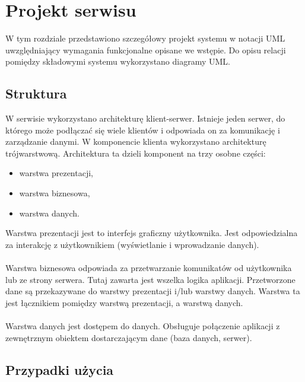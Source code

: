\chapter{Projekt serwisu}
\thispagestyle{chapterBeginStyle}

W tym rozdziale przedstawiono szczegółowy projekt systemu w notacji UML uwzględniający wymagania funkcjonalne opisane we wstępie. Do opisu relacji pomiędzy składowymi systemu wykorzystano diagramy UML.

\section{Struktura}

W serwisie wykorzystano architekturę klient-serwer. Istnieje jeden serwer, do którego może podłączać się wiele klientów i odpowiada on za komunikację i zarządzanie danymi.
W komponencie klienta wykorzystano architekturę trójwarstwową. Architektura ta dzieli komponent na trzy osobne części:
\begin{itemize}
	\item warstwa prezentacji,
	\item warstwa biznesowa,
	\item warstwa danych.
\end{itemize}
Warstwa prezentacji jest to interfejs graficzny użytkownika. Jest odpowiedzialna za interakcję z użytkownikiem (wyświetlanie i wprowadzanie danych). \\ \\
Warstwa biznesowa odpowiada za przetwarzanie komunikatów od użytkownika lub ze strony serwera. Tutaj zawarta jest wszelka logika aplikacji. Przetworzone dane są przekazywane do warstwy prezentacji i/lub warstwy danych. Warstwa ta jest łącznikiem pomiędzy warstwą prezentacji, a warstwą danych. \\ \\
Warstwa danych jest dostępem do danych. Obsługuje połączenie aplikacji z zewnętrznym obiektem dostarczającym dane (baza danych, serwer).

\section{Przypadki użycia}

